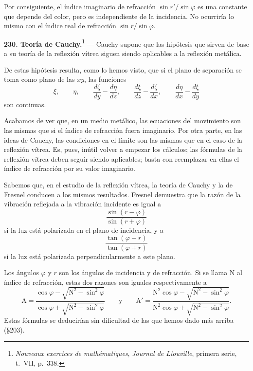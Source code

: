 Por consiguiente, el índice imaginario de refracción $\sin r'/\sin\varphi$
es una constante que depende del color, pero es independiente de la
incidencia. No ocurriría lo mismo con el índice real de refracción
$\sin r/\sin\varphi$.

\noindent\textbf{230. Teoría de Cauchy.}\footnote{\emph{Nouveaux exercices
de mathématiques}, \emph{Journal de Liouville}, primera serie, t.~VII,
p.~338.} — Cauchy supone que las hipótesis que sirven de base a su teoría
de la reflexión vítrea siguen siendo aplicables a la reflexión metálica.

De estas hipótesis resulta, como lo hemos visto, que si el plano de
separación se toma como plano de las $xy$, las funciones
\[
\xi,\qquad \eta,\qquad \frac{d\zeta}{dy}-\frac{d\eta}{dz},\qquad
\frac{d\xi}{dz}-\frac{d\zeta}{dx},\qquad \frac{d\eta}{dx}-\frac{d\xi}{dy}
\]
son continuas.

Acabamos de ver que, en un medio metálico, las ecuaciones del movimiento
son las mismas que si el índice de refracción fuera imaginario. Por otra
parte, en las ideas de Cauchy, las condiciones en el límite son las
mismas que en el caso de la reflexión vítrea. Es, pues, inútil volver a
empezar los cálculos; las fórmulas de la reflexión vítrea deben seguir
siendo aplicables; basta con reemplazar en ellas el índice de refracción
por su valor imaginario.

Sabemos que, en el estudio de la reflexión vítrea, la teoría de Cauchy y
la de Fresnel conducen a los mismos resultados. Fresnel demuestra que la
razón de la vibración reflejada a la vibración incidente es igual a
\[
\frac{\sin(r-\varphi)}{\sin(r+\varphi)}
\]
si la luz está polarizada en el plano de incidencia, y a
\[
\frac{\tan(\varphi-r)}{\tan(\varphi+r)}
\]
si la luz está polarizada perpendicularmente a este plano.

Los ángulos $\varphi$ y $r$ son los ángulos de incidencia y de
refracción. Si se llama N al índice de refracción, estas dos razones son
iguales respectivamente a
\[
\mathrm{A}=\frac{\cos\varphi-\sqrt{\mathrm{N}^2-\sin^2\varphi}}
{\cos\varphi+\sqrt{\mathrm{N}^2-\sin^2\varphi}}
\qquad\text{y}\qquad
\mathrm{A}'=\frac{\mathrm{N}^2\cos\varphi-\sqrt{\mathrm{N}^2-\sin^2\varphi}}
{\mathrm{N}^2\cos\varphi+\sqrt{\mathrm{N}^2-\sin^2\varphi}}.
\]
Estas fórmulas se deducirían sin dificultad de las que hemos dado más
arriba (§203).

